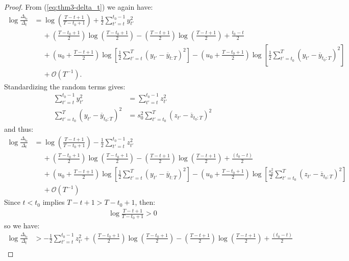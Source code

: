 \begin{proof}
From (\ref{eq:thm3-delta_t}) we again have:
\begin{align*}
    \log \frac{\Delta_{t_0}}{\Delta_t} &= \log \left(\frac{T - t + 1}{T - t_0 +1} \right) + \frac{1}{2} \sum_{t' = t}^{t_0 - 1} y_{t'}^2 \\
    &\quad\: + \left(\frac{T - t_0 + 1}{2}\right) \log\left(\frac{T-t_0+1}{2}\right) - \left(\frac{T - t + 1}{2}\right) \log\left(\frac{T-t+1}{2}\right) + \frac{t_0-t}{2} \\
    &\quad\: + \left(u_0 + \frac{T - t +1}{2}\right)\log\left[ \frac{1}{2}\sum_{t'=t}^T (y_{t'} - \overline{y}_{t:T})^2 \right]  - \left(u_0 + \frac{T - t_0 +1}{2}\right)\log\left[\frac{1}{2}\sum_{t'=t_0}^T (y_{t'} - \overline{y}_{t_0:T})^2 \right] \\
    &\quad\: + \mathcal{O}(T^{-1}).
\end{align*}
Standardizing the random terms gives:
\begin{align*}
    \sum_{t' = t}^{t_0 - 1} y_{t'}^2 &= \sum_{t' = t}^{t_0 - 1} z_{t'}^2 \\
    \sum_{t'=t_0}^T (y_{t'} - \overline{y}_{t_0:T})^2 &= s_0^2 \sum_{t'=t_0}^T  (z_{t'} - \overline{z}_{t_0:T})^2
\end{align*}
and thus:
\begin{align*}
    \log \frac{\Delta_{t_0}}{\Delta_t} &= \log \left(\frac{T - t + 1}{T - t_0 + 1} \right) - \frac{1}{2} \sum_{t' = t}^{t_0 - 1} z_{t'}^2 \\
    &\quad\: + \left(\frac{T - t_0 + 1}{2}\right) \log\left(\frac{T-t_0+1}{2}\right) - \left(\frac{T - t + 1}{2}\right) \log\left(\frac{T-t+1}{2}\right) + \frac{(t_0-t)}{2} \\
    &\quad\: + \left(u_0 + \frac{T - t +1}{2}\right)\log\left[ \frac{1}{2}\sum_{t'=t}^T (y_{t'} - \overline{y}_{t:T})^2 \right]- \left(u_0 + \frac{T - t_0 +1}{2}\right)\log\left[\frac{s_0^2}{2}\sum_{t'=t_0}^T  (z_{t'} - \overline{z}_{t_0:T})^2 \right] \\
    &\quad\: +  \mathcal{O}(T^{-1}) 
\end{align*}
Since $t < t_0$ implies $T-t + 1> T-t_0 +1$, then:
\begin{align*}
    \log\frac{T-t+1}{T-t_0+1} > 0
\end{align*}
so we have:
\begin{align*}
    \log \frac{\Delta_{t_0}}{\Delta_t} &> - \frac{1}{2} \sum_{t' = t}^{t_0 - 1} z_{t'}^2  + \left(\frac{T - t_0+1}{2}\right) \log\left(\frac{T-t_0+1}{2}\right) - \left(\frac{T - t+1}{2}\right) \log\left(\frac{T-t+1}{2}\right) + \frac{(t_0-t)}{2} \\

\end{align*}
\end{proof}
